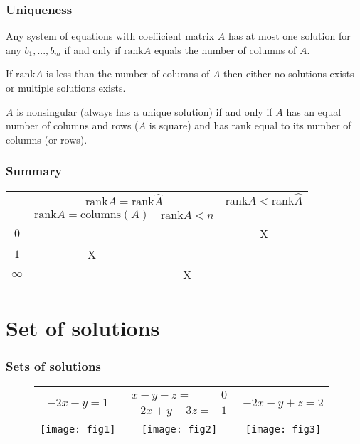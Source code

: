 \documentclass[compress]{beamer}
\newcommand{\rank}{\mathrm{rank}}
\theoremstyle{definition}
\begin{document}
\begin{frame}\frametitle{Uniqueness}
  \begin{theorem} \label{thm:sunique}
    Any system of equations with coefficient matrix $A$ has at most one
    solution for any $b_1, ... , b_m$ if and only if $\rank A$ equals
    the number of columns of $A$. 
  \end{theorem}

  \begin{corollary}\label{cor:smult}
    If $\rank A$ is less than the number of columns of $A$ then either
    no solutions exists or multiple solutions exists.
  \end{corollary}
  
  \begin{corollary}
    $A$ is nonsingular (always has a unique solution) if and only if
    $A$ has an equal number of columns and rows ($A$ is square) and
    has rank equal to its number of columns (or rows).
  \end{corollary}
\end{frame}

\begin{frame}
  \frametitle{Summary}
  \begin{centering}
  \begin{tabular}{c|c|c|c} 
    & \multicolumn{2}{c}{$\rank A = \rank \hat{A}$} &  
    $\rank A < \rank \hat{A} $ \\ 
    & $\rank A = \mathrm{columns}(A)$ & 
    $\rank A < n$ & \\ \hline
    $0$ &  &  & X \\
    $1$ & X & & \\
    $\infty$ & & X & \\ \hline
  \end{tabular}
  \end{centering}
\end{frame}

\section{Set of solutions}

\begin{frame}
  \frametitle{Sets of solutions}
\begin{figure}\label{fig:solnSets}
  \begin{tabular}{ccc}
    $-2x + y = 1$
    &
    $\begin{array}{cc} 
      x - y - z = & 0 \\
      -2x + y + 3z = & 1 
    \end{array}$    
    & 
    $
    -2x - y +  z =  2
    $
    \\
    \texttt{[image: fig1]} & 
    \texttt{[image: fig2]} & 
    \texttt{[image: fig3]} 
  \end{tabular}
\end{figure}
\end{frame}
\end{document}
